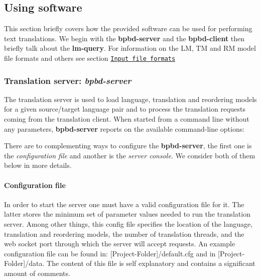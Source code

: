 \subsection*{Using software}

This section briefly covers how the provided software can be used for performing text translations. We begin with the {\bfseries bpbd-\/server} and the {\bfseries bpbd-\/client} then briefly talk about the {\bfseries lm-\/query}. For information on the L\+M, T\+M and R\+M model file formats and others see section \href{#input-file-formats}{\tt Input file formats}

\subsubsection*{Translation server\+: {\itshape bpbd-\/server}}

The translation server is used to load language, translation and reordering models for a given source/target language pair and to process the translation requests coming from the translation client. When started from a command line without any parameters, {\bfseries bpbd-\/server} reports on the available command-\/line options\+:


 There are to complementing ways to configure the {\bfseries bpbd-\/server}, the first one is the {\itshape configuration file} and another is the {\itshape server console}. We consider both of them below in more details.

\paragraph*{Configuration file}

In order to start the server one must have a valid configuration file for it. The latter stores the minimum set of parameter values needed to run the translation server. Among other things, this config file specifies the location of the language, translation and reordering models, the number of translation threads, and the web socket port through which the server will accept requests. An example configuration file can be found in\+: {\ttfamily \mbox{[}Project-\/\+Folder\mbox{]}/default.cfg} and in {\ttfamily \mbox{[}Project-\/\+Folder\mbox{]}/data}. The content of this file is self explanatory and contains a significant amount of comments.

